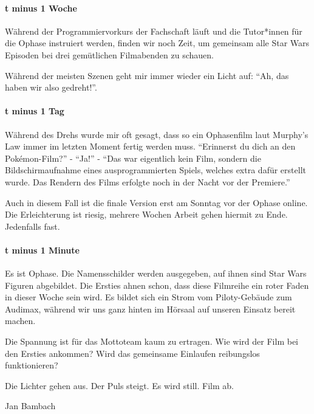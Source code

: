 {    \paragraph{t minus 1 Woche}
    Während der Programmiervorkurs der Fachschaft läuft und die Tutor*innen für die
    Ophase instruiert werden, finden wir noch Zeit, um gemeinsam alle Star Wars
    Episoden bei drei gemütlichen Filmabenden zu schauen.


    Während der meisten Szenen geht mir immer wieder ein Licht auf: \enquote{Ah, das haben
        wir also gedreht!}.


    \paragraph{t minus 1 Tag}
    Während des Drehs wurde mir oft gesagt, dass so ein Ophasenfilm laut Murphy’s
    Law immer im letzten Moment fertig werden muss. \enquote{Erinnerst du dich an den
        Pokémon-Film?} - \enquote{Ja!} - \enquote{Das war eigentlich kein Film, sondern die
        Bildschirmaufnahme eines ausprogrammierten Spiels, welches extra dafür erstellt
        wurde. Das Rendern des Films erfolgte noch in der Nacht vor der Premiere.}


    Auch in diesem Fall ist die finale Version erst am Sonntag vor der Ophase
    online. Die Erleichterung ist riesig, mehrere Wochen Arbeit gehen hiermit zu
    Ende. Jedenfalls fast.
    \paragraph{t minus 1 Minute}
    Es ist Ophase. Die Namensschilder werden ausgegeben, auf ihnen sind Star Wars
    Figuren abgebildet. Die Ersties ahnen schon, dass diese Filmreihe ein roter
    Faden in dieser Woche sein wird. Es bildet sich ein Strom vom Piloty-Gebäude
    zum Audimax, während wir uns ganz hinten im Hörsaal auf unseren Einsatz bereit
    machen.


    Die Spannung ist für das Mottoteam kaum zu ertragen. Wie wird der Film bei
    den Ersties ankommen? Wird das gemeinsame Einlaufen reibungslos funktionieren?


    Die Lichter gehen aus. Der Puls steigt. Es wird still. Film ab.
}
{Jan Bambach}
\vfill
{}
\vfill
\pagebreak
